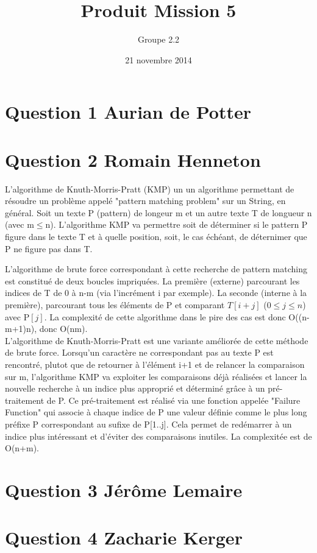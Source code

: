 \documentclass[10pt,a4paper]{article}
\date{21 novembre 2014}
\author{Groupe 2.2}
\title{Produit Mission 5}
\begin{document}
\maketitle

\section*{Question 1 Aurian de Potter}
\section*{Question 2 Romain Henneton}
L'algorithme de Knuth-Morris-Pratt (KMP) un un algorithme permettant de résoudre un problème appelé "pattern matching problem" sur un String, en général. Soit un texte P (pattern) de longeur m et un autre texte T de longueur n (avec m$\leq$n). L'algorithme KMP va permettre soit de déterminer si le pattern P figure dans le texte T et à quelle position, soit, le cas échéant, de déternimer que P ne figure pas dans T.



L'algorithme de brute force correspondant à cette recherche de pattern matching est constitué de deux boucles impriquées. La première (externe) parcourant les indices de T de 0 à n-m (via l'incrément i par exemple). La seconde (interne à la première), parcourant tous les éléments de P et comparant $T[i+j]$ ($0\leq j\leq n$) avec P$[j]$. La complexité de cette algorithme dans le pire des cas est donc O((n-m+1)n), donc O(nm).\\
L'algorithme de Knuth-Morris-Pratt est une variante améliorée de cette méthode de brute force. Lorsqu'un caractère ne correspondant pas au texte P est rencontré, plutot que de retourner à l'élément i+1 et de relancer la comparaison sur m, l'algorithme KMP va exploiter les comparaisons déjà réalisées et lancer la nouvelle recherche à un indice plus approprié et déterminé grâce à un pré-traitement de P. Ce pré-traitement est réalisé via une fonction appelée "Failure Function" qui associe à chaque indice de P une valeur définie comme le plus long préfixe P correspondant au sufixe de P[1..j]. Cela permet de redémarrer à un indice plus intéressant et d'éviter des comparaisons inutiles. La complexitée  est de O(n+m).
\section*{Question 3 Jérôme Lemaire}
\section*{Question 4 Zacharie Kerger}
\end{document}
